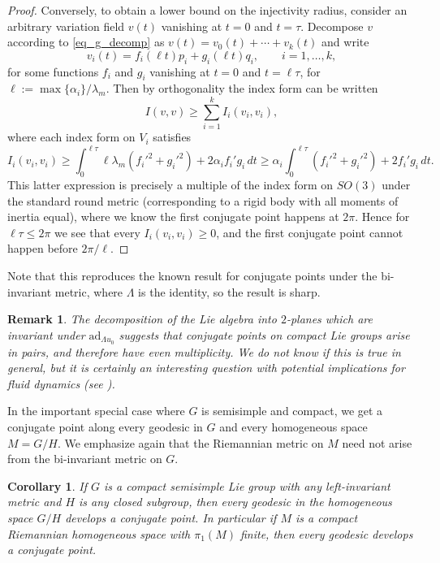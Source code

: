 \documentclass[oneside, 11pt]{amsart}
\newtheorem{remark}[theorem]{Remark}
\newtheorem{corollary}[theorem]{Corollary}
\numberwithin{equation}{section}
\newcommand{\ad}{\mathrm{ad}}
\begin{document}
\begin{proof}
 
 
 
 

Conversely, to obtain a lower bound on the injectivity radius, consider an arbitrary variation field $v(t)$ vanishing at $t = 0$ and $t = \tau$. Decompose $v$ according to \eqref{eq_g_decomp} as $v(t) = v_0(t) + \cdots + v_k(t)$ and write 
\begin{equation*}
v_i(t) = f_i(\ell t)p_i + g_i(\ell t)q_i, \qquad i = 1, \ldots, k,
\end{equation*}
for some functions $f_i$ and $g_i$ vanishing at $t = 0$ and $t = \ell \tau$, for $\ell:=\max\{\alpha_i\}/\lambda_m$. Then by orthogonality the index form can be written 
$$ I(v,v) \ge \sum_{i=1}^k I_i(v_i,v_i),$$
where each index form on $V_i$ satisfies
$$    I_i(v_i,v_i) \ge \int_0^{\ell \tau} \ell \lambda_m (f_i'^2+g_i'^2) + 2 \alpha_i f_i'g_i \, dt \ge \alpha_i \int_0^{\ell \tau}  (f_i'^2+g_i'^2) + 2 f_i'g_i \, dt.$$
This latter expression is precisely a multiple of the index form on $SO(3)$ under the standard round metric (corresponding to a rigid body with all moments of inertia equal), where we know the first conjugate point happens at $2\pi$. Hence for $\ell\tau\le 2\pi$ we see that every $I_i(v_i,v_i)\ge 0$, and the first conjugate point cannot happen before $2\pi/\ell$.
\end{proof}
 


Note that this reproduces the known result for conjugate points under the bi-invariant metric, where $\Lambda$ is the identity, so the result is sharp. 


\begin{remark}
The decomposition of the Lie algebra into $2$-planes which are invariant under $\ad_{\Lambda u_0}$ suggests that conjugate points on compact Lie groups arise in pairs, and therefore have even multiplicity. We do not know if this is true in general, but it is certainly an interesting question with potential implications for fluid dynamics (see \cite{DMSY}). 
\end{remark}
 
In the important special case where $G$ is semisimple and compact, we get a conjugate point along every geodesic in $G$ and every homogeneous space $M=G/H$. We emphasize again that the Riemannian metric on $M$ need not arise from the bi-invariant metric on $G$.


\begin{corollary}\label{homogeneouscorollary} 
If $G$ is a compact semisimple Lie group with any left-invariant metric and $H$ is any closed subgroup, then every geodesic in the homogeneous space $G/H$ develops a conjugate point. In particular if $M$ is a compact Riemannian homogeneous space with $\pi_1(M)$ finite, then every geodesic develops a conjugate point.
\end{corollary}
\end{document}
